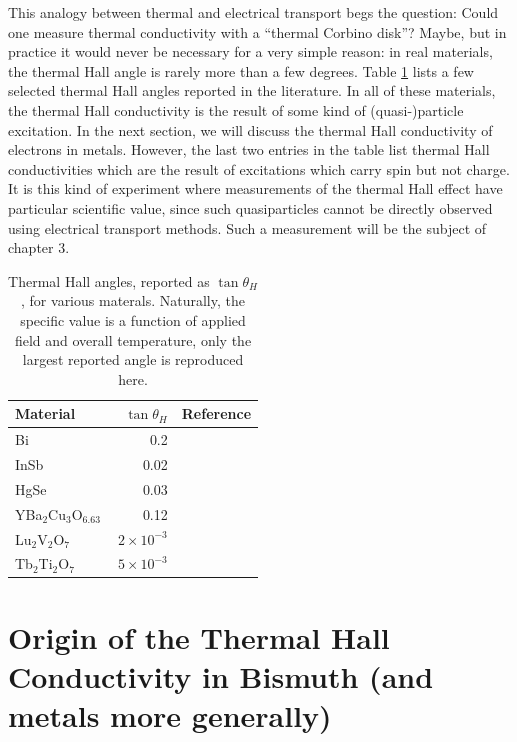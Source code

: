 \documentclass{thesis-umich}
\begin{document}
This analogy between thermal and electrical transport begs the question: Could
one measure thermal conductivity with a ``thermal Corbino disk''? Maybe, but in
practice it would never be necessary for a very simple reason: in real
materials, the thermal Hall angle is rarely more than a few degrees. Table
\ref{hallAngleTable} lists a few selected thermal Hall angles reported in the
literature. In all of these materials, the thermal Hall conductivity is the
result of some kind of (quasi-)particle excitation. In the next section, we
will discuss the thermal Hall conductivity of electrons in metals. However, the
last two entries in the table list thermal Hall conductivities which are the
result of excitations which carry spin but not charge. It is this kind of
experiment where measurements of the thermal Hall effect have particular
scientific value, since such quasiparticles cannot be directly observed using
electrical transport methods. Such a measurement will be the subject of chapter
3.

\begin{table}
\centering
\label{hallAngleTable}
\begin{tabular}{l|r|c}
\hline
Material & $\tan \theta_H$ & Reference \\
\hline
Bi & 0.2 & \cite{Kobayashi2012}  \\
InSb & 0.02 & \cite{Mette1963} \\
HgSe & 0.03 & \cite{Whitsett1961} \\
YBa$_2$Cu$_3$O$_{6.63}$ & 0.12 & \cite{Krishana1999} \\
Lu$_2$V$_2$O$_7$ & $2 \times 10^{-3}$ & \cite{Onose2010} \\
Tb$_2$Ti$_2$O$_7$ & $~5 \times 10^{-3}$ & \cite{Hirschberger2015} \\
\hline
\end{tabular}
\caption[Example thermal Hall angles]{Thermal Hall angles, reported as $\tan \theta_H$, for various materals. Naturally, the specific value is a function of applied field and overall temperature, only the largest reported angle is reproduced here.}
\end{table}
\section{Origin of the Thermal Hall Conductivity in Bismuth (and metals more generally)}
\end{document}
